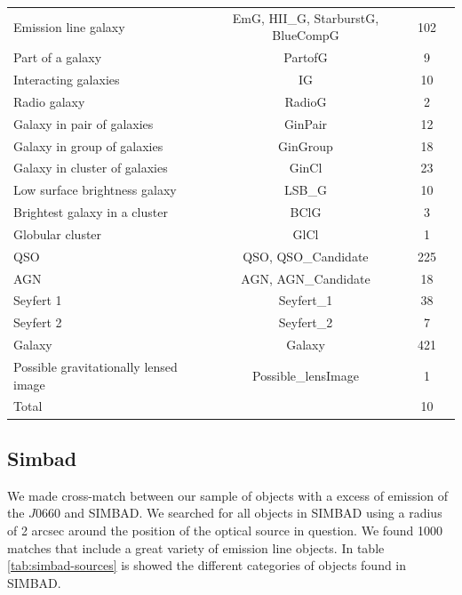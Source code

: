 \documentclass[fleqn,usenatbib]{mnras}
\begin{document}
{\begin{table}
\begin{tabular}{lccc}
Emission line galaxy        & EmG, HII\_G, StarburstG, BlueCompG & 102   \\
Part of a galaxy            & PartofG                & 9                 \\
Interacting galaxies        & IG                     & 10                \\
Radio galaxy                & RadioG                 & 2                 \\
Galaxy in pair of galaxies      & GinPair            & 12                \\
Galaxy in group of galaxies     & GinGroup           & 18                \\
Galaxy in cluster of galaxies   & GinCl              & 23                \\
Low surface brightness galaxy   & LSB\_G             & 10                \\
Brightest galaxy in a cluster   & BClG               & 3                 \\
Globular cluster            & GlCl                   & 1                 \\
QSO                         & QSO, QSO\_Candidate    & 225               \\
AGN                         & AGN, AGN\_Candidate    & 18                \\
Seyfert 1                   & Seyfert\_1             & 38                \\
Seyfert 2                   & Seyfert\_2             & 7                 \\
Galaxy                      &  Galaxy                & 421               \\
Possible gravitationally lensed image & Possible\_lensImage & 1          \\
\hline
Total                       &                               & 10         \\
\hline
\end{tabular}
\end{table}

\subsection{Simbad}

We made cross-match between our sample of objects with a excess of emission of
the $J$0660 and SIMBAD. We searched for all objects in SIMBAD using a radius of 2 arcsec
around the position of the optical source in question. We found 1000
matches that include a great variety of emission line objects. In table
\ref{tab:simbad-sources} is showed the different categories of objects found
in SIMBAD.

}
\end{document}
